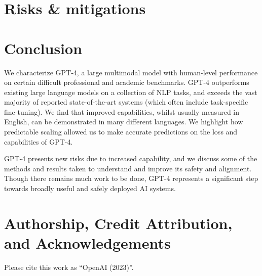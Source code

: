 \documentclass{article}
\begin{document}
\section{Risks \& mitigations}


\section{Conclusion}

We characterize GPT-4, a large multimodal model with human-level performance on certain difficult professional and academic benchmarks. GPT-4 outperforms existing large language models on a collection of NLP tasks, and exceeds the vast majority of reported state-of-the-art systems (which often include task-specific fine-tuning). We find that improved capabilities, whilst usually measured in English, can be demonstrated in many different languages. We highlight how predictable scaling allowed us to make accurate predictions on the loss and capabilities of GPT-4. 

GPT-4 presents new risks due to increased capability, and we discuss some of the methods and results taken to understand and improve its safety and alignment. Though there remains much work to be done, GPT-4 represents a significant step towards broadly useful and safely deployed AI systems.






\newpage
\section*{Authorship, Credit Attribution, and Acknowledgements}
Please cite this work as ``OpenAI (2023)''.
      
\end{document}
